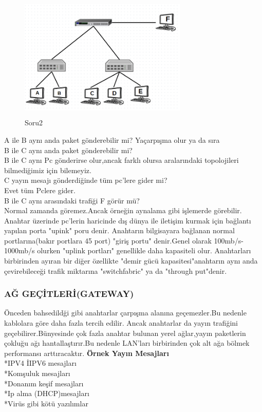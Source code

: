 \begin{figure}[ht]
    \centering

    \includegraphics[width=8cm,height=6cm]{images/Soru2}
    \caption{Soru2}
    \label{fig:lan_vlan_ornegi}
\end{figure}
A ile B aynı anda paket gönderebilir mi? 
Yaçarpışma olur ya da sıra\\
B ile C aynı anda paket gönderebilir mi?\\
 B ile C aynı Pc gönderirse olur,ancak farklı olursa  aralarındaki topolojileri bilmediğimiz için bilemeyiz.\\
C yayın mesajı gönderdiğinde tüm pc'lere gider mi?\\
Evet tüm Pclere gider.\\
B ile C aynı arasındaki trafiği F görür mü?\\
Normal zamanda göremez.Ancak örneğin aynalama gibi işlemerde görebilir.\\
   

Anahtar üzerinde pc'lerin haricinde dış dünya ile iletişim kurmak için bağlantı yapılan porta "upink" poru denir.
Anahtarın bilgisayara bağlanan normal portlarına(bakır portlara 45 port) "giriş portu" denir.Genel olarak 100mb/s-1000mb/s  olurken "uplink portları" genellikle daha kapasiteli olur.
Anahtarları birbirinden ayıran bir diğer özellikte "demir gücü kapasitesi"anahtarın aynı  anda çevirebileceği trafik miktarına "switchfabric" ya da "through put"denir.
\subsubsection*{AĞ GEÇİTLERİ(GATEWAY)}
Önceden bahsedildği gibi anahtarlar çarpışma alanına geçemezler.Bu nedenle kablolara göre daha fazla tercih edilir.
Ancak anahtarlar da yayın trafiğini geçebilirer.Bünyesinde çok fazla anahtar bulunan yerel ağlar,yayın paketlerin çokluğu ağı hantallaştırır.Bu nedenle LAN'ları birbirinden çok alt ağa bölmek performansı arttıracaktır.
\textbf{Örnek Yayın Mesajları}\\
*IPV4 İIPV6 mesajları\\
*Komşuluk mesajları\\
*Donanım keşif mesajları\\
*Ip alma (DHCP)mesajları\\
*Virüs gibi kötü yazılımlar\\
